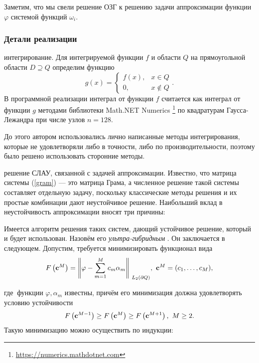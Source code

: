 \documentclass[a4paper]{article}
\begin{document}
Заметим, что мы свели решение ОЗГ к решению задачи аппроксимации функции $\varphi$ системой функций $\omega_i$.

\subsubsection{Детали реализации}
{ интегрирование}. Для интегрируемой функции $f$ и области $Q$ на прямоугольной области $D \supseteq Q$ определим функцию
\begin{equation*}
  g(x)=
  \begin{cases}
    f(x), & x \in Q      \\
    0,    & x \not \in Q
  \end{cases}.
\end{equation*}
В программной реализации интеграл от функции $f$ считается как интеграл от функции $g$ методами библиотеки Math.NET Numerics \footnote{\url{https://numerics.mathdotnet.com}}
по квадратурам Гаусса-Лежандра при числе узлов $n=128$.

До этого автором использовались лично написанные методы интегрирования, которые  не удовлетворяли либо в точности, либо по производительности, поэтому было решено использовать сторонние методы.

{ решение СЛАУ, связанной с задачей аппроксимации}. Известно, что матрица системы (\ref{gram}) --- это матрица Грама, а численное решение такой системы составляет отдельную задачу, поскольку классические методы решения и их простые комбинации дают неустойчивое решение.
Наибольший вклад в неустойчивость аппроксимации вносят три причины:

Имеется алгоритм решения таких систем, дающий устойчивое решение, который и будет использован.
Назовём его {\it ультра-гибридным} .
Он заключается в следующем. Допустим, требуется минимизировать функционал вида
\begin{equation}
  F\left({\bf c}^M\right)={\left\|\varphi -\sum^M_{m=1}{c_m}{\alpha }_m\right\|}_{{\ L}_2\left(\partial Q\right)},\ {\bf c}^M=(c_1,\dots,c_M),
\end{equation}

где $\ \text{функции } \varphi, \alpha_m \text{ известны}$,
причём его минимизация должна удовлетворять условию устойчивости
\begin{equation}F\left({\bf c}^{M-1}\right)\ge F\left({\bf c}^M\right)\ge F\left({\bf c}^{M+1}\right),\ M\ge 2.
\end{equation}
Такую минимизацию можно осуществить по индукции:
\end{document}
